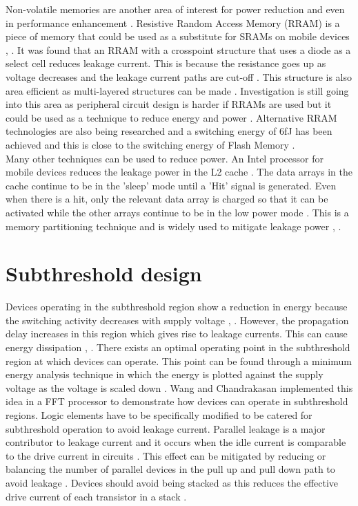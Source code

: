 \documentclass[journal]{IEEEtran}
\begin{document}
Non-volatile memories are another area of interest for power reduction and even in performance enhancement \cite{NonVolatile}. Resistive Random Access Memory (RRAM) is a piece of memory that could be used as a substitute for SRAMs on mobile devices \cite{NonVolatile}, \cite{RRAMSwitch}. It was found that an RRAM with a crosspoint structure that uses a diode as a select cell reduces leakage current. This is because the resistance goes up as voltage decreases and the leakage current paths are cut-off \cite{NonVolatile}. This structure is also area efficient as multi-layered structures can be made \cite{NonVolatile}. Investigation is still going into this area as peripheral circuit design is harder if RRAMs are used but it could be used as a technique to reduce energy and power \cite{NonVolatile}. Alternative RRAM technologies are also being researched and a switching energy of 6fJ has been achieved and this is close to the switching energy of Flash Memory \cite{RRAMSwitch}. \\

Many other techniques can be used to reduce power. An Intel processor for mobile devices reduces the leakage power in the L2 cache \cite{Intel}. The data arrays in the cache continue to be in the 'sleep' mode until a 'Hit' signal is generated. Even when there is a hit, only the relevant data array is charged so that it can be activated while the other arrays continue to be in the low power mode \cite{Intel}. This is a memory partitioning technique and is widely used to mitigate leakage power \cite{Intel}, \cite{L2Mobile}.

\section{Subthreshold design}
Devices operating in the subthreshold region show a reduction in energy because the switching activity decreases with supply voltage \cite{FFT}, \cite{MemSub}. However, the propagation delay increases in this region which gives rise to leakage currents. This can cause energy dissipation \cite{FFT}, \cite{MemSub}. There exists an optimal operating point in the subthreshold region at which devices can operate. This point can be found through a minimum energy analysis technique in which the energy is plotted against the supply voltage as the voltage is scaled down \cite{FFT}. Wang and Chandrakasan \cite{FFT} implemented this idea in a FFT processor to demonstrate how devices can operate in subthreshold regions. Logic elements have to be specifically modified to be catered for subthreshold operation to avoid leakage current. Parallel leakage is a major contributor to leakage current and it occurs when the idle current is comparable to the drive current in circuits \cite{FFT}. This effect can be mitigated by reducing or balancing the number of parallel devices in the pull up and pull down path to avoid leakage \cite{FFT}. Devices should avoid being stacked as this reduces the effective drive current of each transistor in a stack \cite{FFT}. \\
\end{document}
